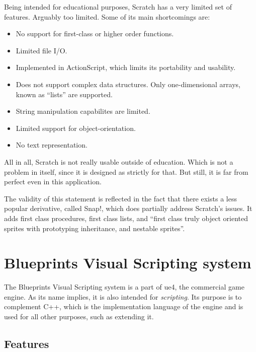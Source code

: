 Being intended for educational purposes, Scratch has a very limited set of features. Arguably too limited. Some of its main shortcomings are:
\begin{itemize}
    \item No support for first-class or higher order functions.
    \item Limited file I/O.
    \item Implemented in ActionScript, which limits its portability and usability.
    \item Does not support complex data structures. Only one-dimensional arrays, known as ``lists'' are supported.
    \item String manipulation capabilites are limited.
    \item Limited support for object-orientation.
    \item No text representation.
\end{itemize}

All in all, Scratch is not really usable outside of education. Which is not a problem in itself, since it is designed as strictly for that. But still, it is far from perfect even in this application.

The validity of this statement is reflected in the fact that there exists a less popular derivative, called Snap!, which does partially address Scratch's issues. It adds first class procedures, first class lists, and ``first class truly object oriented sprites with prototyping inheritance, and nestable sprites''\cite[Section~Features and derivatives]{scratch_wikipedia}.

\section{Blueprints Visual Scripting system}
The Blueprints Visual Scripting system is a part of \acrlong{ue4}, the commercial game engine. As its name implies, it is also intended for \textit{scripting}. Its purpose is to complement C++, which is the implementation language of the engine and is used for all other purposes, such as extending it.

\subsection{Features}

